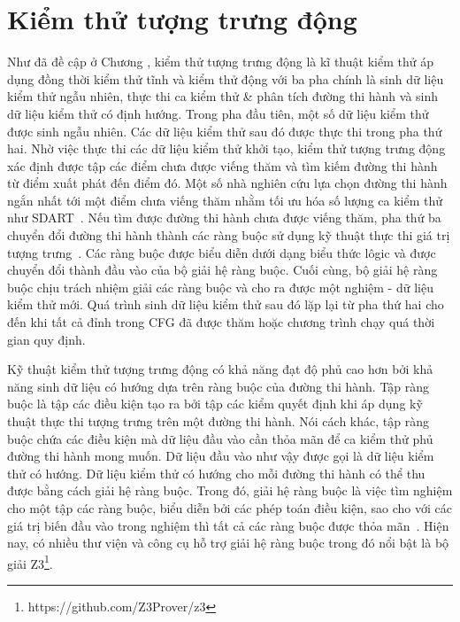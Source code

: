 \section{Kiểm thử tượng trưng động}
Như đã đề cập ở Chương , kiểm thử tượng trưng động là kĩ thuật kiểm thử áp dụng đồng thời kiểm thử tĩnh và kiểm thử động với ba pha chính là sinh dữ liệu kiểm thử ngẫu nhiên, thực thi ca kiểm thử \& phân tích đường thi hành và sinh dữ liệu kiểm thử có định hướng. Trong pha đầu tiên, một số dữ liệu kiểm thử được sinh ngẫu nhiên. Các dữ liệu kiểm thử sau đó được thực thi trong pha thứ hai. Nhờ việc thực thi các dữ liệu kiểm thử khởi tạo, kiểm thử tượng trưng động xác định được tập các điểm chưa được viếng thăm và
tìm kiếm đường thi hành từ điểm xuất phát đến điểm đó. Một số nhà nghiên cứu lựa chọn đường thi hành ngắn nhất tới một điểm chưa viếng thăm nhằm tối ưu hóa số lượng ca kiểm thử như SDART~\cite{SDART}. Nếu tìm được đường thi hành chưa được viếng thăm, pha thứ ba chuyển đổi đường thi hành thành các ràng buộc sử dụng kỹ thuật thực thi giá trị tượng trưng~\cite{SymbolicExecutionForSoftwareTestingThreeDecadesLater}. Các ràng buộc được biểu diễn dưới dạng biểu thức lôgic và được chuyển đổi thành đầu vào của bộ giải hệ ràng buộc. Cuối cùng, bộ giải hệ ràng buộc chịu trách nhiệm giải các ràng buộc và cho ra được một nghiệm - dữ liệu kiểm thử mới. Quá trình sinh dữ liệu kiểm thử sau đó lặp lại từ pha thứ hai cho đến khi tất cả đỉnh trong CFG đã được thăm hoặc chương trình chạy quá thời gian quy định. 

Kỹ thuật kiểm thử tượng trưng động có khả năng đạt độ phủ cao hơn bởi khả năng sinh dữ liệu có hướng dựa trên ràng buộc của đường thi hành. Tập ràng buộc là tập các điều kiện tạo ra bởi tập các kiểm quyết định khi áp dụng kỹ thuật thực thi tượng trưng trên một đường thi hành. Nói cách khác, tập ràng buộc chứa các điều kiện mà dữ liệu đầu vào cần thỏa mãn để ca kiểm thử phủ đường thi hành mong muốn. Dữ liệu đầu vào như vậy được gọi là dữ liệu kiểm thử có hướng. Dữ liệu kiểm thử có hướng cho mỗi đường thi hành có thể thu được bằng cách giải hệ ràng buộc. Trong đó, giải hệ ràng buộc là việc tìm nghiệm cho một tập các ràng buộc, biểu diễn bởi các phép toán điều kiện, sao cho với các giá trị biến đầu vào trong nghiệm thì tất cả các ràng buộc được thỏa mãn~\cite{ref-constraints}. Hiện nay, có nhiều thư viện và công cụ hỗ trợ giải hệ ràng buộc trong đó nổi bật là bộ giải Z3\footnote{https://github.com/Z3Prover/z3}.

